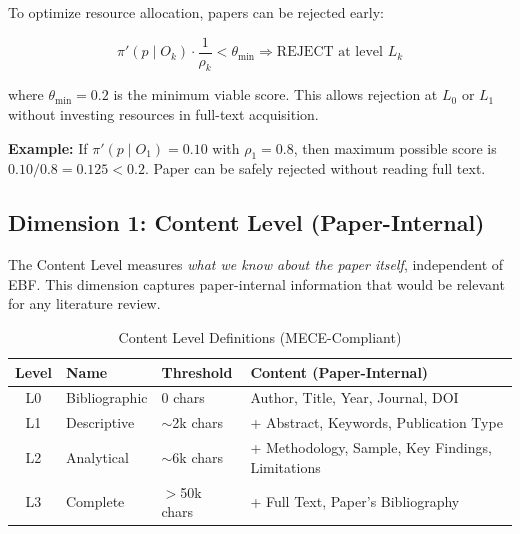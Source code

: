 \begin{tcolorbox}[colback=gray!10!white, colframe=gray!75!black,
    title=\textbf{Operational Rule: Early Rejection Threshold}]

To optimize resource allocation, papers can be rejected early:

\begin{equation}
\pi'(p \mid O_k) \cdot \frac{1}{\rho_k} < \theta_{\min} \Rightarrow \text{REJECT at level } L_k
\end{equation}

where $\theta_{\min} = 0.2$ is the minimum viable score. This allows rejection at $L_0$ or $L_1$
without investing resources in full-text acquisition.

\textbf{Example:} If $\pi'(p \mid O_1) = 0.10$ with $\rho_1 = 0.8$, then maximum possible
score is $0.10 / 0.8 = 0.125 < 0.2$. Paper can be safely rejected without reading full text.
\end{tcolorbox}

\subsection{Dimension 1: Content Level (Paper-Internal)}

The Content Level measures \textit{what we know about the paper itself}, independent of EBF.
This dimension captures paper-internal information that would be relevant for any literature review.

\begin{table}[htbp]
\centering
\caption{Content Level Definitions (MECE-Compliant)}
\label{tab:content-levels}
\renewcommand{\arraystretch}{1.3}
\begin{tabular}{@{}cllp{5.5cm}@{}}
\toprule
\textbf{Level} & \textbf{Name} & \textbf{Threshold} & \textbf{Content (Paper-Internal)} \\
\midrule
L0 & Bibliographic & 0 chars & Author, Title, Year, Journal, DOI \\
L1 & Descriptive & $\sim$2k chars & + Abstract, Keywords, Publication Type \\
L2 & Analytical & $\sim$6k chars & + Methodology, Sample, Key Findings, Limitations \\
L3 & Complete & $>$50k chars & + Full Text, Paper's Bibliography \\
\bottomrule
\end{tabular}
\end{table}

